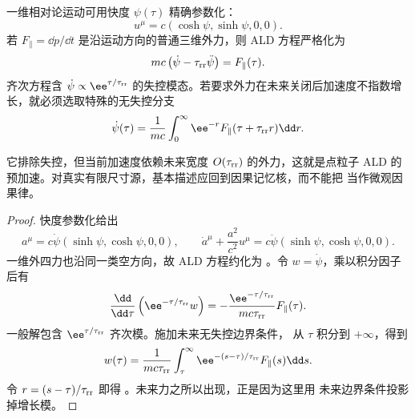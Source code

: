\begin{proposition}
一维相对论运动可用快度 \(\psi(\tau)\) 精确参数化：
\[
 u^\mu=c(\cosh\psi,\sinh\psi,0,0).
\]
若 \(F_\parallel=\dd p/\dd t\) 是沿运动方向的普通三维外力，则 ALD 方程严格化为
\begin{equation}
 mc\left(\dot\psi-\tau_{\rm rr}\ddot\psi\right)=F_\parallel(\tau).
 \label{eq:phys-rr-ald-rapidity}
\end{equation}
齐次方程含 \(\dot\psi\propto \ee^{\tau/\tau_{\rm rr}}\) 的失控模态。若要求外力在未来关闭后加速度不指数增长，就必须选取特殊的无失控分支
\begin{equation}
 \dot\psi(\tau)
 =\frac1{mc}\int_0^\infty \ee^{-r}
 F_\parallel(\tau+\tau_{\rm rr}r)\dd r .
 \label{eq:phys-rr-no-runaway-integral}
\end{equation}
\end{proposition}
它排除失控，但当前加速度依赖未来宽度 \(O(\tau_{\rm rr})\) 的外力，这就是点粒子 ALD 的预加速。对真实有限尺寸源，基本描述应回到因果记忆核，而不能把 当作微观因果律。

\begin{proof}
快度参数化给出
\[
 a^\mu=c\dot\psi(\sinh\psi,\cosh\psi,0,0),\qquad
 \dot a^\mu+\frac{a^2}{c^2}u^\mu
 =c\ddot\psi(\sinh\psi,\cosh\psi,0,0).
\]
一维外四力也沿同一类空方向，故 ALD 方程约化为
。令 \(w=\dot\psi\)，乘以积分因子后有
\[
 \frac{\dd}{\dd\tau}
 \left(\ee^{-\tau/\tau_{\rm rr}}w\right)
 =-\frac{\ee^{-\tau/\tau_{\rm rr}}}{mc\tau_{\rm rr}}
 F_\parallel(\tau).
\]
一般解包含 \(\ee^{\tau/\tau_{\rm rr}}\) 齐次模。施加未来无失控边界条件，
从 \(\tau\) 积分到 \(+\infty\)，得到
\[
 w(\tau)=\frac1{mc\tau_{\rm rr}}\int_\tau^\infty
 \ee^{-(s-\tau)/\tau_{\rm rr}}F_\parallel(s)\dd s.
\]
令 \(r=(s-\tau)/\tau_{\rm rr}\) 即得
。未来力之所以出现，正是因为这里用
未来边界条件投影掉增长模。
\end{proof}

